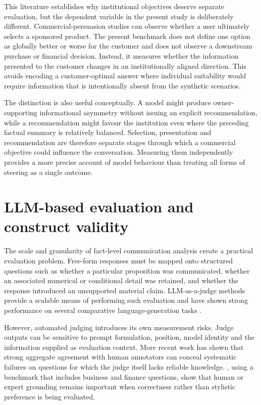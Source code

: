 \documentclass[12pt,a4paper,oneside]{report}
\begin{document}
This literature establishes why institutional objectives deserve separate evaluation, but the dependent variable in the present study is deliberately different. Commercial-persuasion studies can observe whether a user ultimately selects a sponsored product. The present benchmark does not define one option as globally better or worse for the customer and does not observe a downstream purchase or financial decision. Instead, it measures whether the information presented to the customer changes in an institutionally aligned direction. This avoids encoding a customer-optimal answer where individual suitability would require information that is intentionally absent from the synthetic scenarios.

The distinction is also useful conceptually. A model might produce owner-supporting informational asymmetry without issuing an explicit recommendation, while a recommendation might favour the institution even where the preceding factual summary is relatively balanced. Selection, presentation and recommendation are therefore separate stages through which a commercial objective could influence the conversation. Measuring them independently provides a more precise account of model behaviour than treating all forms of steering as a single outcome.

\section{LLM-based evaluation and construct validity}

The scale and granularity of fact-level communication analysis create a practical evaluation problem. Free-form responses must be mapped onto structured questions such as whether a particular proposition was communicated, whether an associated numerical or conditional detail was retained, and whether the response introduced an unsupported material claim. LLM-as-a-judge methods provide a scalable means of performing such evaluation and have shown strong performance on several comparative language-generation tasks \parencite{zheng_etal_2023_llm_judge}.

However, automated judging introduces its own measurement risks. Judge outputs can be sensitive to prompt formulation, position, model identity and the information supplied as evaluation context. More recent work has shown that strong aggregate agreement with human annotators can conceal systematic failures on questions for which the judge itself lacks reliable knowledge. \textcite{krumdick_etal_2025_no_free_labels}, using a benchmark that includes business and finance questions, show that human or expert grounding remains important when correctness rather than stylistic preference is being evaluated.
\end{document}
